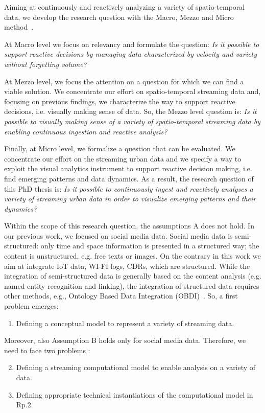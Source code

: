 Aiming at continuously and reactively analyzing a variety of spatio-temporal data, we develop the research question with the Macro, Mezzo and Micro method~\cite{lacasse2015making}.

At Macro level we focus on relevancy and formulate the question: \textit{Is it possible to support reactive decisions by managing data characterized by velocity and variety without forgetting volume?}

At Mezzo level, we focus the attention on a question for which we can find a viable solution. We concentrate our effort on spatio-temporal streaming data and, focusing on previous findings, we characterize the way to support reactive decisions, i.e. visually making sense of data. So, the Mezzo level question is: \textit{Is it possible to visually making sense of a variety of spatio-temporal streaming data by enabling continuous ingestion and reactive analysis?}

Finally, at Micro level, we formalize a question that can be evaluated. We concentrate our effort on the streaming urban data and we specify a way to exploit the visual analytics instrument to support reactive decision making, i.e. find emerging patterns and data dynamics. As a result, the research question of this PhD thesis is: \textit{Is it possible to continuously ingest and reactively analyses a variety of streaming urban data in order to visualize emerging patterns and their dynamics?}

Within the scope of this research question, the  assumptions A does not hold. In our previous work, we focused on social media data. Social media data is semi-structured: only time and space information is presented in a structured way; the content is unstructured, e.g. free texts or images.
On the contrary in this work we aim at integrate IoT data, WI-FI logs, CDRs, which are structured.
While the integration of semi-structured data is generally based on the content analysis (e.g. named entity recognition and linking), the integration of structured data requires other methods, e.g., Ontology Based Data Integration (OBDI)~\cite{LenzeriniOBDI}.
So, a first problem emerges:
\begin{enumerate}[leftmargin=32pt,label=\textsf{Rp.\arabic*}]
\item Defining a conceptual model to represent a variety of streaming data.
\end{enumerate}

Moreover, also Assumption B holds only for social media data. Therefore, we need to face two problems :
\begin{enumerate}[leftmargin=32pt,label=\textsf{Rp.\arabic*}]
\setcounter{enumi}{1}
\item Defining a streaming computational model to enable analysis on a variety of data.
\item Defining appropriate technical instantiations of the computational model in \textsf{Rp.2}.
\end{enumerate}

